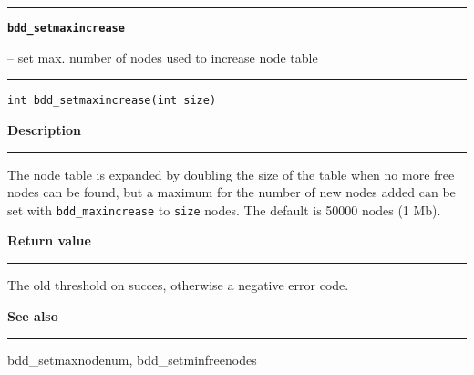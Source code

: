 \begin{minipage}{\textwidth}

\noindent\begin{minipage}{\textwidth}
\rule{\textwidth}{0.5mm}
{\tt\bf bdd\_setmaxincrease }
\--- set max. number of nodes used to increase node table  \hspace{\fill}
\\\rule[1.5ex]{\textwidth}{0.5mm}
\end{minipage}

\noindent\begin{verbatim}
int bdd_setmaxincrease(int size) 
\end{verbatim}

\vspace{\parsep}\noindent
{\bf Description}\\\rule[1.5ex]{\textwidth}{0.2mm}\vspace{-1.5ex}\setlength{\parindent}{1em}
The node table is expanded by doubling the size of the table
           when no more free nodes can be found, but a maximum for the
	   number of new nodes added can be set with {\tt bdd\_maxincrease}
	   to {\tt size} nodes. The default is 50000 nodes (1 Mb). 

\setlength{\parindent}{0em}\vspace{\parsep}\vspace{\baselineskip}\noindent
{\bf Return value}\\\rule[1.5ex]{\textwidth}{0.2mm}\vspace{-1.5ex}
The old threshold on succes, otherwise a negative error code. 

\vspace{\parsep}\vspace{\baselineskip}\noindent
{\bf See also}\\\rule[1.5ex]{\textwidth}{0.2mm}\vspace{-1.5ex}
bdd\_setmaxnodenum, bdd\_setminfreenodes 
\end{minipage}
\vspace{8ex}
